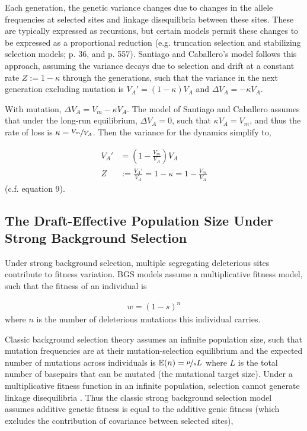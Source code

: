 \documentclass[11pt]{article}
\newcommand{\E}{\mathbb{E}}
\begin{document}
Each generation, the genetic variance changes due to changes in the allele
frequencies at selected sites and linkage disequilibria between these sites.
These are typically expressed as recursions, but certain models permit these
changes to be expressed as a proportional reduction (e.g. truncation selection
and stabilizing selection models; \cite{Keightley1988-eq} p. 36, and
\cite{Walsh2018-bt} p. 557). Santiago and Caballero's model follows this
approach, assuming the variance decays due to selection and drift at a constant
rate $Z := 1-\kappa$ through the generations, such that the variance in the next
generation excluding mutation is $V_A' = (1-\kappa) V_A$ and $\Delta V_A =
-\kappa V_A$.

With mutation, $\Delta V_A = V_m - \kappa V_A$. The model of Santiago and
Caballero assumes that under the long-run equilibrium, $\Delta V_A = 0$, such
that $\kappa V_A = V_m$, and thus the rate of loss is $\kappa =
\nicefrac{V_m}{V_A}$. Then the variance for the dynamics simplify to,

\begin{align}
  \label{eq:Z}
  V_A' &= \left(1 - \frac{V_m}{V_A}\right) V_A \nonumber \\
  Z &:= \frac{V_A'}{V_A} = 1 - \kappa = 1 - \frac{V_m}{V_A} 
\end{align}
%
(c.f. \cite{Santiago1998-bs} equation 9). 


\subsection{The Draft-Effective Population Size Under Strong Background Selection}

Under strong background selection, multiple segregating deleterious sites
contribute to fitness variation. BGS models assume a multiplicative fitness
model, such that the fitness of an individual is

\begin{align}
  w = (1-s)^{n}
\end{align}
%
where $n$ is the number of deleterious mutations this individual carries.

Classic background selection theory assumes an infinite population size, such
that mutation frequencies are at their mutation-selection equilibrium and the
expected number of mutations across individuals is $\E(n) = \nicefrac{\mu}{s}L$
where $L$ is the total number of basepairs that can be mutated (the mutational
target size).  Under a multiplicative fitness function in an infinite
population, selection cannot generate linkage disequilibria
\parencite{Turelli1990-kd}. Thus the classic strong background selection model
assumes additive genetic fitness is equal to the additive genic fitness (which
excludes the contribution of covariance between selected sites), 
\end{document}
